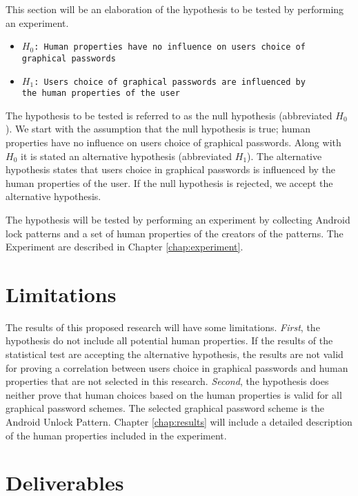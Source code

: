 		This section will be an elaboration of the hypothesis to be tested by performing an experiment.

		{\renewcommand\labelitemi{}
			\begin{itemize}
	  		\item \texttt{$H_{0}$: Human properties have no influence on users choice of \\graphical passwords}
	  		\item \texttt{$H_{1}$: Users choice of graphical passwords are influenced by \\the human properties of the user}
	  	\end{itemize}
	  }

	  The hypothesis to be tested is referred to as the null hypothesis (abbreviated $H_{0}$). We start with the assumption that the null hypothesis is true; human properties have no influence on users choice of graphical passwords. Along with $H_{0}$ it is stated an alternative hypothesis (abbreviated $H_{1}$). The alternative hypothesis states that users choice in graphical passwords is influenced by the human properties of the user. If the null hypothesis is rejected, we accept the alternative hypothesis. 

	  The hypothesis will be tested by performing an experiment by collecting Android lock patterns and a set of human properties of the creators of the patterns. The Experiment are described in Chapter \ref{chap:experiment}.

	\section{Limitations}

	  The results of this proposed research will have some limitations. {\it First}, the hypothesis do not include all potential human properties. If the results of the statistical test are accepting the alternative hypothesis, the results are not valid for proving a correlation between users choice in graphical passwords and human properties that are not selected in this research. {\it Second}, the hypothesis does neither prove that human choices based on the human properties is valid for all graphical password schemes. The selected graphical password scheme is the Android Unlock Pattern. Chapter \ref{chap:results} will include a detailed description of the human properties included in the experiment.

	\section{Deliverables} \label{sec:deliverables}

